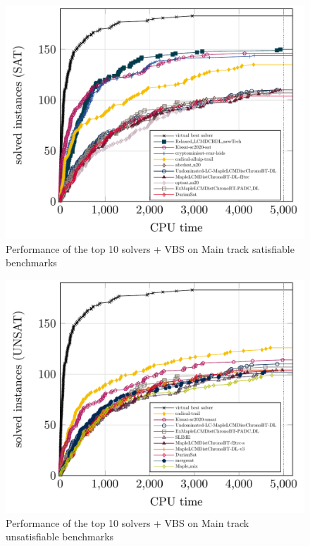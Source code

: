 \documentclass{elsarticle}
\begin{document}
\begin{figure}
\centering
\includegraphics[width=.9\textwidth]{img/paper-main-top10-SAT.pdf}
\caption{Performance of the top 10 solvers + VBS on Main track satisfiable benchmarks}
\end{figure}

\begin{figure}
\centering
\includegraphics[width=.9\textwidth]{img/paper-main-top10-UNSAT.pdf}
\caption{Performance of the top 10 solvers + VBS on Main track unsatisfiable benchmarks}
\end{figure}
\end{document}
